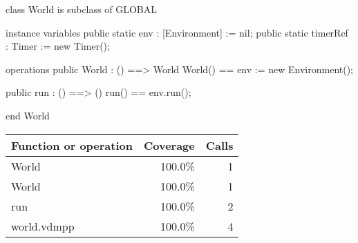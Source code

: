 \documentclass[a4paper]{article}
\begin{document}
\title{}
\author{}
\begin{vdm_al}
class World is subclass of GLOBAL

instance variables
    public static env : [Environment] := nil;
    public static timerRef : Timer := new Timer();

operations
    public World : () ==> World
    World() == env := new Environment();

    public run : () ==> ()
    run() == env.run();

end World
\end{vdm_al}
\bigskip
\begin{longtable}{|l|r|r|}
\hline
Function or operation & Coverage & Calls \\
\hline
\hline
World & 100.0\% & 1 \\
\hline
World & 100.0\% & 1 \\
\hline
run & 100.0\% & 2 \\
\hline
\hline
world.vdmpp & 100.0\% & 4 \\
\hline
\end{longtable}
\end{document}
